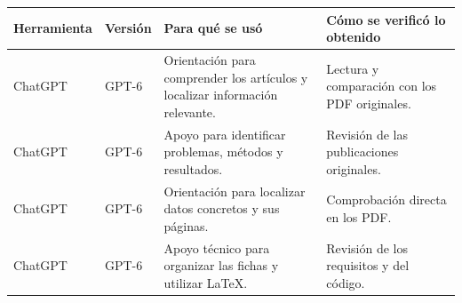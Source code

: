 \begin{tabularx}{\textwidth}{@{}ll>{\raggedright\arraybackslash}X>{\raggedright\arraybackslash}X@{}}
  \toprule
  \textbf{Herramienta} & \textbf{Versión} & \textbf{Para qué se usó} & \textbf{Cómo se verificó lo obtenido} \\
  \midrule
  ChatGPT & GPT-6 & Orientación para comprender los artículos y localizar información relevante. & Lectura y comparación con los PDF originales. \\

  ChatGPT & GPT-6 & Apoyo para identificar problemas, métodos y resultados. & Revisión de las publicaciones originales. \\

  ChatGPT & GPT-6 & Orientación para localizar datos concretos y sus páginas. & Comprobación directa en los PDF. \\

  ChatGPT & GPT-6 & Apoyo técnico para organizar las fichas y utilizar LaTeX. & Revisión de los requisitos y del código. \\
  \bottomrule
\end{tabularx}
